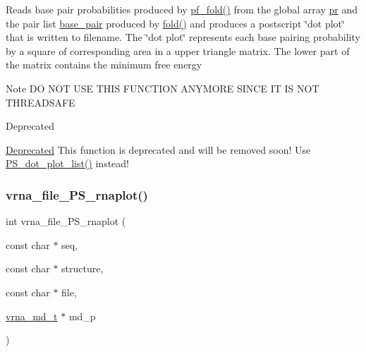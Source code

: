 Reads base pair probabilities produced by \hyperlink{group__part__func__global__deprecated_gadc3db3d98742427e7001a7fd36ef28c2}{pf\+\_\+fold()} from the global array \hyperlink{fold__vars_8h_ac98ec419070aee6831b44e5c700f090f}{pr} and the pair list \hyperlink{fold__vars_8h_a0244a629b5ab4f58b77590c3dfd130dc}{base\+\_\+pair} produced by \hyperlink{group__mfe__global__deprecated_gaadafcb0f140795ae62e5ca027e335a9b}{fold()} and produces a postscript \char`\"{}dot plot\char`\"{} that is written to \textquotesingle{}filename\textquotesingle{}. The \char`\"{}dot plot\char`\"{} represents each base pairing probability by a square of corresponding area in a upper triangle matrix. The lower part of the matrix contains the minimum free energy \begin{DoxyNote}{Note}
DO N\+OT U\+SE T\+H\+IS F\+U\+N\+C\+T\+I\+ON A\+N\+Y\+M\+O\+RE S\+I\+N\+CE IT IS N\+OT T\+H\+R\+E\+A\+D\+S\+A\+FE
\end{DoxyNote}
\begin{DoxyRefDesc}{Deprecated}
\item[\hyperlink{deprecated__deprecated000159}{Deprecated}]This function is deprecated and will be removed soon! Use \hyperlink{group__plotting__utils_ga00ea223b5cf02eb2faae5ff29f0d5e12}{P\+S\+\_\+dot\+\_\+plot\+\_\+list()} instead! \end{DoxyRefDesc}
\mbox{\label{group__plotting__utils_gabdc8f6548ba4a3bc3cd868ccbcfdb86a}} 
\subsubsection{\texorpdfstring{vrna\+\_\+file\+\_\+\+P\+S\+\_\+rnaplot()}{vrna\_file\_PS\_rnaplot()}}
{\footnotesize\ttfamily int vrna\+\_\+file\+\_\+\+P\+S\+\_\+rnaplot (\begin{DoxyParamCaption}\item[{const char $\ast$}]{seq,  }\item[{const char $\ast$}]{structure,  }\item[{const char $\ast$}]{file,  }\item[{\hyperlink{group__model__details_ga1f8a10e12a0a1915f2a4eff0b28ea17c}{vrna\+\_\+md\+\_\+t} $\ast$}]{md\+\_\+p }\end{DoxyParamCaption})}



